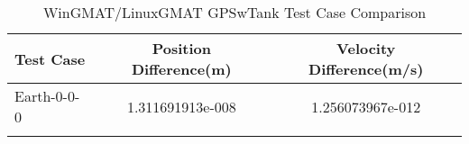\begin{table}[htbp!]
\centering
\caption{ WinGMAT/LinuxGMAT GPSwTank Test Case Comparison}
      \begin{tabular}{lcc}
      \hline\hline
          Test Case & Position Difference(m) & Velocity Difference(m/s) \\
         \hline
         Earth-0-0-0 & 1.311691913e-008 & 1.256073967e-012 \\
      \hline\hline
      \label{Table: GPSwTank WinGMAT-LinuxGMAT Table} 
\end{tabular}
\end{table}
